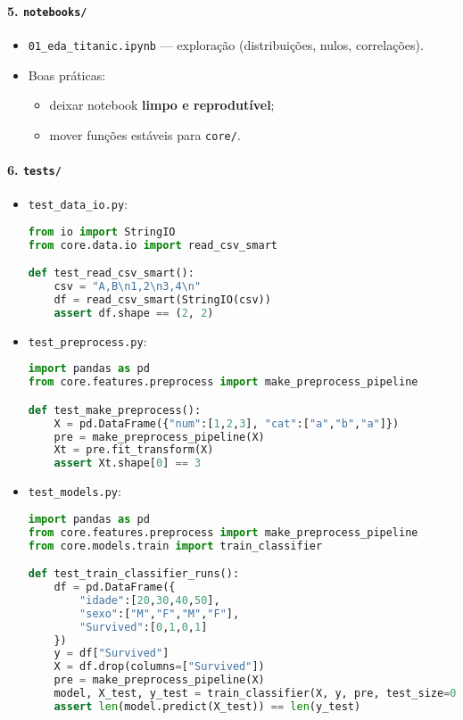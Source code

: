 \documentclass[12pt,a4paper]{article}
\begin{document}
\paragraph{5. \texttt{notebooks/}}
\begin{itemize}
  \item \texttt{01\_eda\_titanic.ipynb} --- exploração (distribuições, nulos, correlações).
  \item Boas práticas:
  \begin{itemize}
    \item deixar notebook \textbf{limpo e reprodutível};
    \item mover funções estáveis para \texttt{core/}.
  \end{itemize}
\end{itemize}

\paragraph{6. \texttt{tests/}}
\begin{itemize}
  \item \texttt{test\_data\_io.py}:
\begin{lstlisting}[language=python]
from io import StringIO
from core.data.io import read_csv_smart

def test_read_csv_smart():
    csv = "A,B\n1,2\n3,4\n"
    df = read_csv_smart(StringIO(csv))
    assert df.shape == (2, 2)
\end{lstlisting}
  \item \texttt{test\_preprocess.py}:
\begin{lstlisting}[language=python]
import pandas as pd
from core.features.preprocess import make_preprocess_pipeline

def test_make_preprocess():
    X = pd.DataFrame({"num":[1,2,3], "cat":["a","b","a"]})
    pre = make_preprocess_pipeline(X)
    Xt = pre.fit_transform(X)
    assert Xt.shape[0] == 3
\end{lstlisting}
  \item \texttt{test\_models.py}:
\begin{lstlisting}[language=python]
import pandas as pd
from core.features.preprocess import make_preprocess_pipeline
from core.models.train import train_classifier

def test_train_classifier_runs():
    df = pd.DataFrame({
        "idade":[20,30,40,50],
        "sexo":["M","F","M","F"],
        "Survived":[0,1,0,1]
    })
    y = df["Survived"]
    X = df.drop(columns=["Survived"])
    pre = make_preprocess_pipeline(X)
    model, X_test, y_test = train_classifier(X, y, pre, test_size=0.5)
    assert len(model.predict(X_test)) == len(y_test)
\end{lstlisting}
\end{itemize}
\end{document}
